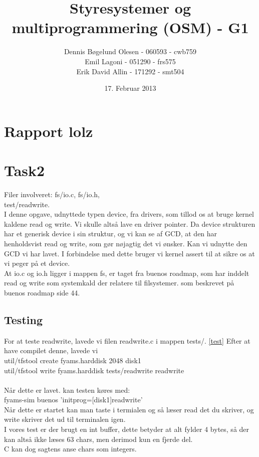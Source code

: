 \documentclass[a4paper,12pt]{article}
\title{Styresystemer og multiprogrammering (OSM) - G1}
\author{Dennis Bøgelund Olesen - 060593 - cwb759 \\ Emil Lagoni - 051290 - frs575 \\ Erik David Allin - 171292 - smt504}
\date{17. Februar 2013}
\begin{document}
\maketitle %
\thispagestyle{empty}
\setcounter{page}{0}
\newpage


\section{Rapport lolz}
\section{Task2}
Filer involveret:
fs/io.c, fs/io.h, \\
test/readwrite.\\

I denne opgave, udnyttede typen device, fra drivers, som tillod os at bruge kernel kaldene read og write. Vi skulle altså lave en driver pointer.
Da device strukturen har et generisk device i sin struktur, og vi kan se af GCD, at den har henholdsvist read og write, som gør nøjagtig det vi ønsker.
Kan vi udnytte den GCD vi har lavet.
I forbindelse med dette bruger vi kernel assert til at sikre os at vi peger på et device.\\
At io.c og io.h ligger i mappen fs, er taget fra buenos roadmap, som har inddelt read og write som systemkald der relatere til filsystemer. som beskrevet på buenos roadmap side 44. 
\\
\subsection{Testing}
For at teste readwrite, lavede vi filen readwrite.c i mappen tests/. \ref{test}
Efter at have compilet denne, lavede vi\\
util/tfstool create fyams.harddisk 2048 disk1\\
util/tfstool write fyams.harddisk tests/readwrite readwrite\\
\\
Når dette er lavet. kan testen køres med:\\
fyams-sim buenos 'initprog=[disk1]readwrite'\\
Når dette er startet kan man taste i termialen og så læser read det du skriver, og write skriver det ud til terminalen igen.\\
I vores test er der brugt en int buffer, dette betyder at alt fylder 4 bytes, så der kan altså ikke læses 63 chars, men derimod kun en fjerde del. \\
C kan dog sagtens anse chars som integers.\\
\end{document}

